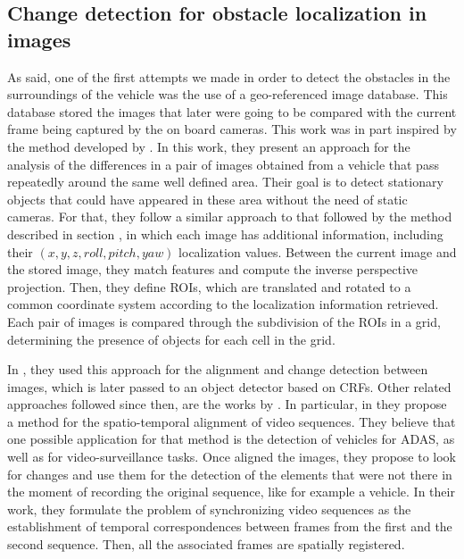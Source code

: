 \subsection{Change detection for obstacle localization in images}\label{ch:chapter00_02_01}

As said, one of the first attempts we made in order to detect the obstacles in the surroundings of the vehicle was the use of a geo-referenced image database. This database stored the images that later were going to be compared with the current frame being captured by the on board cameras. This work was in part inspired by the method developed by \cite{primdahl2005change}. In this work, they present an approach for the analysis of the differences in a pair of images obtained from a vehicle that pass repeatedly around the same well defined area. Their goal is to detect stationary objects that could have appeared in these area without the need of static cameras. For that, they follow a similar approach to that followed by the method described in section , in which each image has additional information, including their $(x, y, z, roll, pitch, yaw)$ localization values. Between the current image and the stored image, they match features and compute the inverse perspective projection. Then, they define \acp{ROI}, which are translated and rotated to a common coordinate system according to the localization information retrieved. Each pair of images is compared through the subdivision of the \acp{ROI} in a grid, determining the presence of objects for each cell in the grid.

In \cite{vallespi2012prior}, they used this approach for the alignment and change detection between images, which is later passed to an object detector based on \ac{CRFs}. Other related approaches followed since then, are the works by \cite{diego2011video, evangelidis2011slice, evangelidis2011efficient}. In particular, in \cite{diego2011video} they propose a method for the spatio-temporal alignment of video sequences. They believe that one possible application for that method is the detection of vehicles for \ac{ADAS}, as well as for video-surveillance tasks. Once aligned the images, they propose to look for changes and use them for the detection of the elements that were not there in the moment of recording the original sequence, like for example a vehicle. In their work, they formulate the problem of synchronizing video sequences as the establishment of temporal correspondences between frames from the first and the second sequence. Then, all the associated frames are spatially registered.

